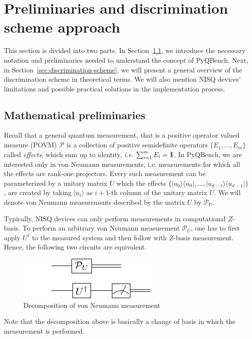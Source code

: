 \documentclass[preprint,12pt, a4paper, dvipsnames]{elsarticle}
\newcommand{\ie}{{\emph{i.e.\/}}}
\newcommand{\ket}[1]{\ensuremath{|#1\rangle}}
\newcommand{\bra}[1]{\ensuremath{\langle#1|}}
\newcommand{\ketbra}[2]{\ensuremath{\ket{#1}\bra{#2}}}
\newcommand{\proj}[1]{\ensuremath{\ketbra{#1}{#1}}}
\newcommand{\1}{{\rm 1\hspace{-0.9mm}l}}
\newcommand{\PP}{\mathcal{P}}
\begin{document}
\section{Preliminaries and discrimination scheme approach}
This section is divided into two parts.
In Section~\ref{sec:maths}, we introduce the necessary notation and preliminaries needed to understand the concept of PyQBench. Next, in Section~\ref{sec:discrimination-scheme},
we will present a general overview of the discrimination scheme in theoretical terms. We will also mention NISQ devices' limitations and possible practical solutions in the implementation process.

\subsection{Mathematical preliminaries}\label{sec:maths}
Recall that a general quantum
measurement, that is a positive operator valued measure (POVM) $\PP$ is a
collection of positive semidefinite operators $\{E_1, \ldots, E_m \}$ called
\emph{effects}, which sum up to identity, \ie $ \, \, \sum_{i=1}^m E_i = \1$.
In PyQBench, we are interested only in von Neumann measurements, i.e. measurements
for which all the effects are rank-one projectors. Every such measurement can be
parameterized by a unitary matrix $U$ which the effects $\{\proj{u_0}, \ldots, \proj{u_{d-1}}\}$,
are created by taking $\ket{u_i}$ as  $i+1$-th column of the unitary matrix $U$.
We will denote von Neumann measurements described by the matrix $U$ by $\PP_{U}$.

Typically, NISQ devices can only perform measurements in computational $Z$-basis.
To perform an arbitrary von Neumann measurement $\PP_{U}$, one has to first apply $U^\dagger$
to the measured system and then follow with $Z$-basis measurement. Hence, the following two
circuits are equivalent.

\begin{figure}[h!]
	\centering
	\includegraphics[scale=1.7]{pics/vonneuman}
	\caption{Decomposition of von Neumann measurement}
	\label{fig:vonnneuman}
\end{figure}

Note that the decomposition above is basically a change of basis in which the measurement
is performed.
\end{document}
